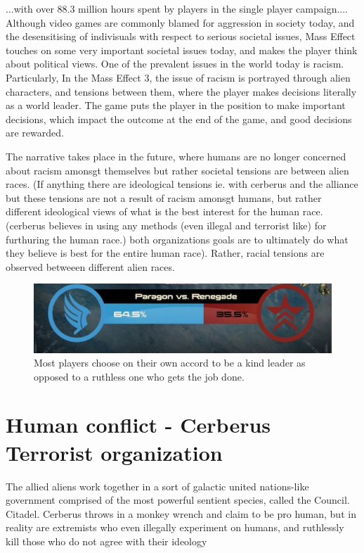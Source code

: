 \documentclass[journal]{IEEEtran}
\begin{document}
...with over 88.3 million hours spent by players in the single player campaign.\cite{ea}...
Although video games are commonly blamed for aggression in society today,
and the desensitising of indivisuals with respect to serious societal issues, Mass Effect  touches on some very important societal issues today, and
makes the player think about political views. One of the prevalent issues in the world today is
racism. Particularly, In the Mass Effect 3, the issue of racism is portrayed through alien characters, and
tensions between them, where the player makes decisions literally as a world leader. The game puts the player in the position to
make important decisions, which impact the outcome at the end of the game, and good decisions are rewarded.

The narrative takes place in the future, where humans are no longer concerned about racism amonsgt themselves but rather societal
tensions are between alien races. (If anything there are ideological tensions ie. with cerberus and the alliance but these
tensions are not a result of racism amonsgt humans, but rather different ideological views of what is the best interest for the human race. (cerberus believes in using any methods (even illegal and terrorist like) for furthuring the human race.)
both organizations goals are to ultimately do what they believe is best for the entire human race). Rather, racial tensions are observed betweeen different alien races.

\begin{figure}
 \includegraphics[scale=2]{paragon}
 \caption{Most players choose on their own accord to be a kind leader as opposed to a ruthless one who gets the job done. \cite{ea}}
\end{figure}

\section{Human conflict - Cerberus Terrorist organization}
The allied aliens work together in a sort of galactic united nations-like government comprised of the most powerful sentient species, called the Council. Citadel. Cerberus throws in a monkey wrench and claim to be pro human,
but in reality are extremists who even illegally experiment on humans,
and ruthlessly kill those who do not agree with their ideology
\end{document}
